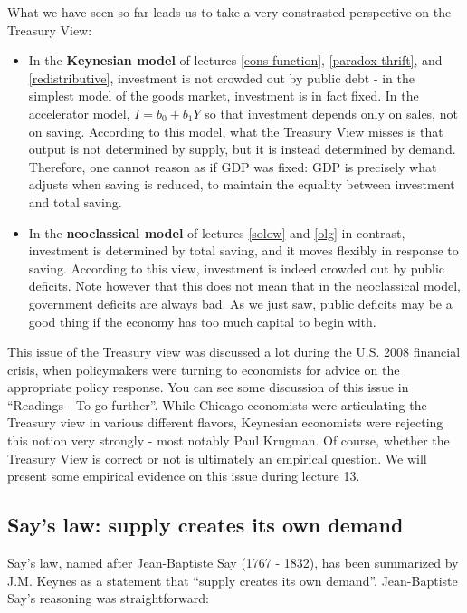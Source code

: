 \documentclass[]{book}
\begin{document}
What we have seen so far leads us to take a very constrasted perspective
on the Treasury View:

\begin{itemize}
\item
  In the \textbf{Keynesian model} of lectures \ref{cons-function},
  \ref{paradox-thrift}, and \ref{redistributive}, investment is not
  crowded out by public debt - in the simplest model of the goods
  market, investment is in fact fixed. In the accelerator model,
  \(I=b_0 + b_1 Y\) so that investment depends only on sales, not on
  saving. According to this model, what the Treasury View misses is that
  output is not determined by supply, but it is instead determined by
  demand. Therefore, one cannot reason as if GDP was fixed: GDP is
  precisely what adjusts when saving is reduced, to maintain the
  equality between investment and total saving.
\item
  In the \textbf{neoclassical model} of lectures \ref{solow} and
  \ref{olg} in contrast, investment is determined by total saving, and
  it moves flexibly in response to saving. According to this view,
  investment is indeed crowded out by public deficits. Note however that
  this does not mean that in the neoclassical model, government deficits
  are always bad. As we just saw, public deficits may be a good thing if
  the economy has too much capital to begin with.
\end{itemize}

This issue of the Treasury view was discussed a lot during the U.S. 2008
financial crisis, when policymakers were turning to economists for
advice on the appropriate policy response. You can see some discussion
of this issue in ``Readings - To go further''. While Chicago economists
were articulating the Treasury view in various different flavors,
Keynesian economists were rejecting this notion very strongly - most
notably Paul Krugman. Of course, whether the Treasury View is correct or
not is ultimately an empirical question. We will present some empirical
evidence on this issue during lecture 13.

\subsection{Say's law: supply creates its own
demand}\label{says-law-supply-creates-its-own-demand}

Say's law, named after Jean-Baptiste Say (1767 - 1832), has been
summarized by J.M. Keynes as a statement that ``supply creates its own
demand''. Jean-Baptiste Say's reasoning was straightforward:
\end{document}
